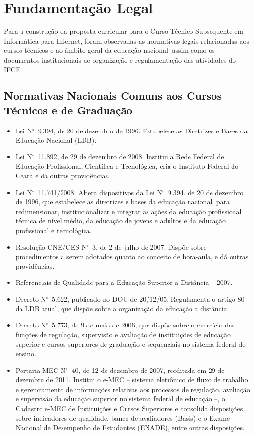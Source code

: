 \documentclass[
	12pt,				%
	openright,			%
	twoside,			%
	a4paper,			%
	chapter=TITLE,		%
	english,			%
	french,				%
	spanish,			%
	brazil,				%
	]{abntex2}
\newcommand{\n}{N$^\circ$}
\begin{document}
\chapter{Fundamentação Legal}
Para a construção da proposta curricular para o Curso Técnico Subsequente em Informática para Internet, foram observadas as normativas legais relacionadas aos cursos técnicos e ao âmbito geral da educação nacional, assim como os documentos institucionais de organização e regulamentação das atividades do IFCE.

\section{Normativas Nacionais Comuns aos Cursos Técnicos e de Graduação}

\begin{itemize}
   \item Lei \n~9.394, de 20 de dezembro de 1996. Estabelece as Diretrizes e Bases da Educação Nacional (LDB).
   \item Lei \n~11.892, de 29 de dezembro de 2008. Institui a Rede Federal de Educação Profissional, Científica e Tecnológica, cria o Instituto Federal do Ceará e dá outras providências.
    \item Lei \n~11.741/2008. Altera dispositivos da Lei \n~9.394, de 20 de dezembro de 1996, que estabelece as diretrizes e bases da educação nacional, para redimensionar, institucionalizar e integrar as ações da educação profissional técnica de nível médio, da educação de jovens e adultos e da educação profissional e tecnológica.
    \item Resolução CNE/CES \n~3, de 2 de julho de 2007. Dispõe sobre procedimentos a serem adotados quanto ao conceito de hora-aula, e dá outras providências.
    \item Referenciais de Qualidade para a Educação Superior a Distância -- 2007.
    \item  Decreto \n~5.622, publicado no DOU de 20/12/05. Regulamenta o artigo 80 da LDB
    atual, que dispõe sobre a organização da educação a distância.
    \item  Decreto \n~5.773, de 9 de maio de 2006, que dispõe sobre o exercício das funções de regulação, supervisão e avaliação de instituições de educação superior e cursos superiores de graduação e sequenciais no sistema federal de ensino.
    \item Portaria MEC \n~40, de 12 de dezembro de 2007, reeditada em 29 de dezembro de 2011. Institui o e-MEC -- sistema eletrônico de fluxo de trabalho e gerenciamento de informações relativas aos processos de regulação, avaliação e supervisão da educação superior no sistema federal de educação --, o Cadastro e-MEC de Instituições e Cursos Superiores e consolida disposições sobre indicadores de qualidade, banco de avaliadores (Basis) e o Exame Nacional de Desempenho de Estudantes (ENADE), entre outras disposições.

\end{itemize}
\end{document}
